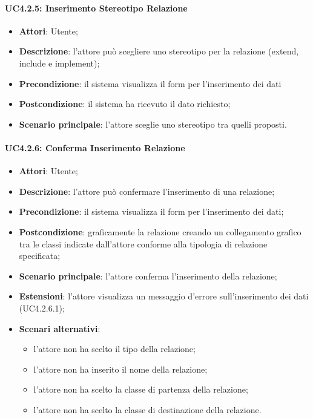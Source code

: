 \paragraph{UC4.2.5: Inserimento Stereotipo Relazione}
\label{UC4.2.5}
\begin{itemize}
	\item \textbf{Attori}: Utente;
	\item \textbf{Descrizione}: l'attore può scegliere uno stereotipo per la relazione (extend, include e implement);
	\item \textbf{Precondizione}: il sistema visualizza il form per l'inserimento dei dati
	\item \textbf{Postcondizione}: il sistema ha ricevuto il dato richiesto;
	\item \textbf{Scenario principale}: l'attore sceglie uno stereotipo tra quelli proposti.
\end{itemize}

\paragraph{UC4.2.6: Conferma Inserimento Relazione}
\label{UC4.2.6}
\begin{itemize}
	\item \textbf{Attori}: Utente;
	\item \textbf{Descrizione}: l'attore può confermare l'inserimento di una relazione;
	\item \textbf{Precondizione}: il sistema visualizza il form per l'inserimento dei dati;
	\item \textbf{Postcondizione}: graficamente la relazione creando un collegamento grafico tra le classi indicate dall'attore conforme alla tipologia di relazione specificata;
	\item \textbf{Scenario principale}: l'attore conferma l'inserimento della relazione;
	\item \textbf{Estensioni}: l'attore visualizza un messaggio d'errore sull'inserimento dei dati (UC4.2.6.1);
	\item \textbf{Scenari alternativi}:
	\begin{itemize}
		\item l'attore non ha scelto il tipo della relazione;
		\item l'attore non ha inserito il nome della relazione;
		\item l'attore non ha scelto la classe di partenza della relazione;
		\item l'attore non ha scelto la classe di destinazione della relazione.
	\end{itemize}
\end{itemize}

